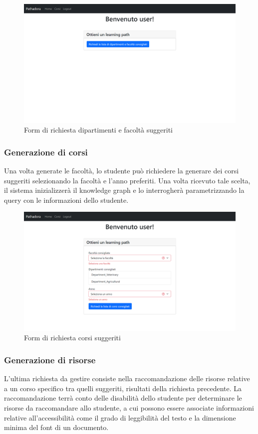 \begin{figure}[H]
\centering
\includegraphics[scale=0.4]{res/faculties-generation.png}
\caption{Form di richiesta dipartimenti e facoltà suggeriti}
\label{fig:faculties-generation}
\end{figure}

\subsubsection{Generazione di corsi}
Una volta generate le facoltà, lo studente può richiedere la generare dei corsi suggeriti selezionando la facoltà e l'anno preferiti. 
Una volta ricevuto tale scelta, il sistema inizializzerà il knowledge graph e lo interrogherà parametrizzando la query con le informazioni dello studente.

\begin{figure}[H]
\centering
\includegraphics[scale=0.4]{res/courses-generation.png}
\caption{Form di richiesta corsi suggeriti}
\label{fig:courses-generation}
\end{figure}

\subsubsection{Generazione di risorse}
L'ultima richiesta da gestire consiste nella raccomandazione delle risorse relative a un corso specifico tra quelli suggeriti, risultati della richiesta precedente.
La raccomandazione terrà conto delle disabilità dello studente per determinare le risorse da raccomandare allo studente, a cui possono essere associate informazioni relative all'accessibilità come il grado di leggibilità del testo e la dimensione minima del font di un documento.

